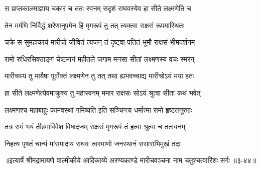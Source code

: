 \twolineshloka
{स प्राप्तकालमाज्ञाय चकार च ततः स्वनम्}
{सदृशं राघवस्येव हा सीते लक्ष्मणेति च} %

\twolineshloka
{तेन मर्मणि निर्विद्धं शरेणानुपमेन हि}
{मृगरूपं तु तत् त्यक्त्वा राक्षसं रूपमास्थितः} %

\twolineshloka
{चक्रे स सुमहाकायं मारीचो जीवितं त्यजन्}
{तं दृष्ट्वा पतितं भूमौ राक्षसं भीमदर्शनम्} %

\twolineshloka
{रामो रुधिरसिक्ताङ्गं चेष्टमानं महीतले}
{जगाम मनसा सीतां लक्ष्मणस्य वचः स्मरन्} %

\twolineshloka
{मारीचस्य तु मायैषा पूर्वोक्तं लक्ष्मणेन तु}
{तत् तथा ह्यभवच्चाद्य मारीचोऽयं मया हतः} %

\twolineshloka
{हा सीते लक्ष्मणेत्येवमाक्रुश्य तु महास्वनम्}
{ममार राक्षसः सोऽयं श्रुत्वा सीता कथं भवेत्} %

\twolineshloka
{लक्ष्मणश्च महाबाहुः कामवस्थां गमिष्यति}
{इति सञ्चिन्त्य धर्मात्मा रामो हृष्टतनूरुहः} %

\twolineshloka
{तत्र रामं भयं तीव्रमाविवेश विषादजम्}
{राक्षसं मृगरूपं तं हत्वा श्रुत्वा च तत्स्वनम्} %

\twolineshloka
{निहत्य पृषतं चान्यं मांसमादाय राघवः}
{त्वरमाणो जनस्थानं ससाराभिमुखं तदा} %


॥इत्यार्षे श्रीमद्रामायणे वाल्मीकीये आदिकाव्ये अरण्यकाण्डे मारीचवञ्चना नाम चतुश्चत्वारिंशः सर्गः ॥३-४४॥

